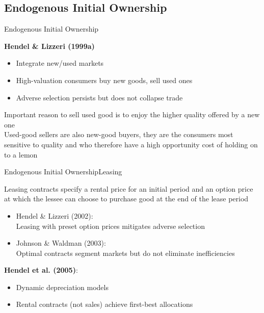 \documentclass[aspectratio=169]{beamer}  %
\begin{document}
\subsection{Endogenous Initial Ownership}
\begin{frame}{Endogenous Initial Ownership}{ }
\begin{spacing}{1.75}
 
{\small
\textbf{Hendel \& Lizzeri (1999a)} \\

    \begin{itemize}
        \item Integrate new/used markets
        \item High-valuation consumers buy new goods, sell used ones
        \item Adverse selection persists but does not collapse trade
    \end{itemize}
Important reason to sell used good is to enjoy the higher quality offered by a new one \\
Used-good sellers are also new-good buyers, they are the consumers most sensitive to quality and who therefore have a high opportunity cost of holding on to a lemon
}
\end{spacing}
\end{frame}

\begin{frame}{Endogenous Initial Ownership}{Leasing }
\begin{spacing}{1.5}
 
{\small
Leasing contracts specify a rental price for an initial period and an option price at which the lessee can choose to purchase good at the end of the lease period
    \begin{itemize}
        \item Hendel \& Lizzeri (2002):\\
        Leasing with preset option prices mitigates adverse selection
        \item Johnson \& Waldman (2003):\\
        Optimal contracts segment markets but do not eliminate inefficiencies
    \end{itemize}
\textbf{Hendel et al. (2005)}:
    \begin{itemize}
        \item Dynamic depreciation models
        \item Rental contracts (not sales) achieve first-best allocations
    \end{itemize}
}
\end{spacing}
\end{frame}
\end{document}
